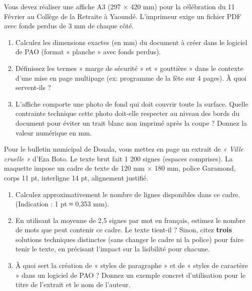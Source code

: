 \documentclass[11pt]{article}
\begin{document}
\begin{exercice}
Vous devez réaliser une affiche A3 (297 × 420 mm) pour la célébration du 11 Février au Collège de la Retraite à Yaoundé. L'imprimeur exige un fichier PDF avec fonds perdus de 3 mm de chaque côté.
\begin{enumerate}
    \item Calculez les dimensions exactes (en mm) du document à créer dans le logiciel de PAO (format « planche » avec fonds perdus).
    \item Définissez les termes « marge de sécurité » et « gouttière » dans le contexte d'une mise en page multipage (ex: programme de la fête sur 4 pages). À quoi servent-ils ?
    \item L'affiche comporte une photo de fond qui doit couvrir toute la surface. Quelle contrainte technique cette photo doit-elle respecter au niveau des bords du document pour éviter un trait blanc non imprimé après la coupe ? Donnez la valeur numérique en mm.
\end{enumerate}
\end{exercice}

\begin{exercice}
Pour le bulletin municipal de Douala, vous mettez en page un extrait de \textit{« Ville cruelle »} d'Eza Boto. Le texte brut fait 1 200 signes (espaces comprises). La maquette impose un cadre de texte de 120 mm × 180 mm, police Garamond, corps 11 pt, interligne 14 pt, alignement justifié.
\begin{enumerate}
    \item Calculez approximativement le nombre de lignes disponibles dans ce cadre. (Indication : 1 pt ≈ 0,353 mm).
    \item En utilisant la moyenne de 2,5 signes par mot en français, estimez le nombre de mots que peut contenir ce cadre. Le texte tient-il ? Sinon, citez \textbf{trois} solutions techniques distinctes (sans changer le cadre ni la police) pour faire tenir le texte, en précisant l'impact sur la lisibilité pour chacune.
    \item À quoi sert la création de « styles de paragraphe » et de « styles de caractère » dans un logiciel de PAO ? Donnez un exemple concret d'utilisation pour le titre de l'extrait et le nom de l'auteur.
\end{enumerate}
\end{exercice}
\end{document}
